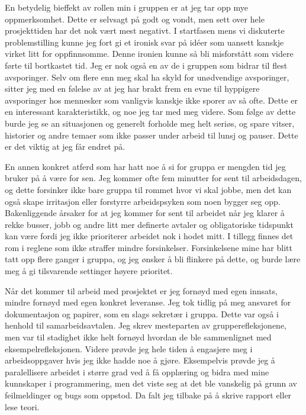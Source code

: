 En betydelig bieffekt av rollen min i gruppen er at jeg tar opp mye oppmerksomhet. Dette er selvsagt på godt og vondt, men sett over hele prosjekttiden har det nok vært mest negativt. I startfasen mens vi diskuterte problemstilling kunne jeg fort gi et ironisk svar på idéer som uansett kanskje virket litt for oppfinnsomme. Denne ironien kunne så bli misforstått som videre førte til bortkastet tid. Jeg er nok også en av de i gruppen som bidrar til flest avsporinger. Selv om flere enn meg skal ha skyld for unødvendige avsporinger, sitter jeg med en følelse av at jeg har brakt frem en evne til hyppigere avsporinger hos mennesker som vanligvis kanskje ikke sporer av så ofte. Dette er en interessant karakteristikk, og noe jeg tar med meg videre. Som følge av dette burde jeg se an situasjonen og generelt forholde meg helt seriøs, og spare vitser, historier og andre temaer som ikke passer under arbeid til lunsj og pauser. Dette er det viktig at jeg får endret på.

En annen konkret atferd som har hatt noe å si for gruppa er mengden tid jeg bruker på å være for sen. Jeg kommer ofte fem minutter for sent til arbeidsdagen, og dette forsinker ikke bare gruppa til rommet hvor vi skal jobbe, men det kan også skape irritasjon eller forstyrre arbeidspsyken som noen bygger seg opp. Bakenliggende årsaker for at jeg kommer for sent til arbeidet når jeg klarer å rekke busser, jobb og andre litt mer definerte avtaler og obligatoriske tidspunkt kan være fordi jeg ikke prioriterer arbeidet nok i hodet mitt. I tillegg finnes det rom i reglene som ikke straffer mindre forsinkelser. Forsinkelsene mine har blitt tatt opp flere ganger i gruppa, og jeg ønsker å bli flinkere på dette, og burde lære meg å gi tilsvarende settinger høyere prioritet.   

Når det kommer til arbeid med prosjektet er jeg fornøyd med egen innsats, mindre fornøyd med egen konkret leveranse. Jeg tok tidlig på meg ansvaret for dokumentasjon og papirer, som en slags sekretær i gruppa. Dette var også i henhold til samarbeidsavtalen. Jeg skrev mesteparten av grupperefleksjonene, men var til stadighet ikke helt fornøyd hvordan de ble sammenlignet med eksempelrefleksjonen. Videre prøvde jeg hele tiden å engasjere meg i arbeidsoppgaver hvis jeg ikke hadde noe å gjøre. Eksempelvis prøvde jeg å paralellisere arbeidet i større grad ved å få opplæring og bidra med mine kunnskaper i programmering, men det viste seg at det ble vanskelig på grunn av feilmeldinger og bugs som oppstod. Da falt jeg tilbake på å skrive rapport eller lese teori. 

